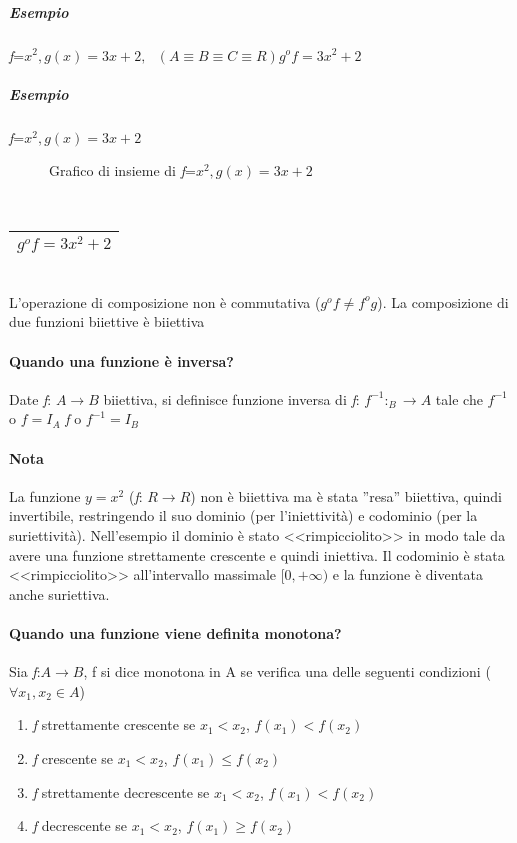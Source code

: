 \subparagraph{Esempio} \textit{f}=$x^2,g(x)=3x+2, \text{ } (A \equiv B \equiv C
\equiv R) g^of=3x^2+2$

\subparagraph {Esempio}
\textit{f}=$x^2,g(x)=3x+2$

\begin{figure}[!ht]
	\centering
	\caption{Grafico di insieme di \textit{f}=$x^2,g(x)=3x+2$}
\end{figure}\\
\begin{tabular}{|l|}
	\hline
		$g^o f=3x^2+2$\\
	\hline
\end{tabular}\\
L'operazione di composizione non è commutativa ($g^of\neq f^og$). La
composizione di due funzioni biiettive è biiettiva

\paragraph{Quando una funzione è inversa?}
Date \textit{f}: $A\to B$ biiettiva, si definisce funzione inversa di
\textit{f}: $f^{-1}:_B\to A$ tale che $f^{-1}$ o $f=I_A$ \textit{f} o
$f^{-1}=I_B$

\paragraph{Nota} La funzione $y=x^2$ (\textit{f}: $R\to R$) non è biiettiva ma
è stata ''resa'' biiettiva, quindi invertibile, restringendo il suo dominio (per l'iniettività) e codominio (per la suriettività). Nell'esempio il dominio è stato <<rimpicciolito>> in modo tale da avere una funzione strettamente crescente e quindi iniettiva. Il codominio è stata <<rimpicciolito>> all'intervallo massimale $[0,+\infty)$ e la funzione è diventata anche suriettiva.

\paragraph{Quando una funzione viene definita monotona?}
Sia \textit{f}:$A\to B$, f si dice monotona in A se verifica una delle seguenti
condizioni ($\forall x_1,x_2\in A$)

\begin{enumerate}
	\item \textit{f} strettamente crescente se $x_1<x_2$, $f(x_1)<f(x_2)$
	\item \textit{f} crescente se $x_1<x_2$, $f(x_1)\leq f(x_2)$
	\item \textit{f} strettamente decrescente se $x_1<x_2$, $f(x_1)<f(x_2)$
	\item \textit{f} decrescente se $x_1<x_2$, $f(x_1)\geq f(x_2)$
\end{enumerate}

